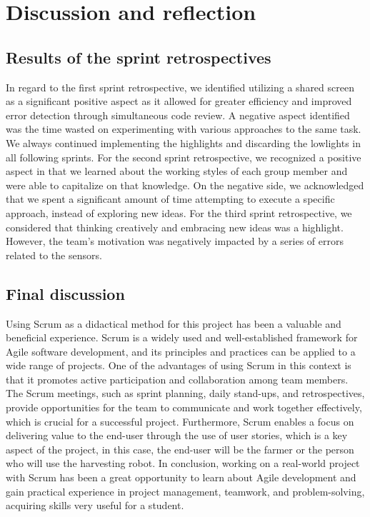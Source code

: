 \section{Discussion and reflection} \label{sec:RecommendationsAndConclusion}
\subsection{Results of the sprint retrospectives}
\noindent In regard to the first sprint retrospective, we identified utilizing a shared screen as a significant positive aspect as it allowed for greater efficiency and improved error detection through simultaneous code review. A negative aspect identified was the time wasted on experimenting with various approaches to the same task. We always continued implementing the highlights and discarding the lowlights in all following sprints.
For the second sprint retrospective, we recognized a positive aspect in that we learned about the working styles of each group member and were able to capitalize on that knowledge. On the negative side, we acknowledged that we spent a significant amount of time attempting to execute a specific approach, instead of exploring new ideas.
For the third sprint retrospective, we considered that thinking creatively and embracing new ideas was a highlight. However, the team's motivation was negatively impacted by a series of errors related to the sensors.

\subsection{Final discussion}
\noindent Using Scrum as a didactical method for this project has been a valuable and beneficial experience. Scrum is a widely used and well-established framework for Agile software development, and its principles and practices can be applied to a wide range of projects.
One of the advantages of using Scrum in this context is that it promotes active participation and collaboration among team members. The Scrum meetings, such as sprint planning, daily stand-ups, and retrospectives, provide opportunities for the team to communicate and work together effectively, which is crucial for a successful project. 
Furthermore, Scrum enables a focus on delivering value to the end-user through the use of user stories, which is a key aspect of the project, in this case, the end-user will be the farmer or the person who will use the harvesting robot.
In conclusion, working on a real-world project with Scrum has been a great opportunity to learn about Agile development and gain practical experience in project management, teamwork, and problem-solving, acquiring skills very useful for a student.

